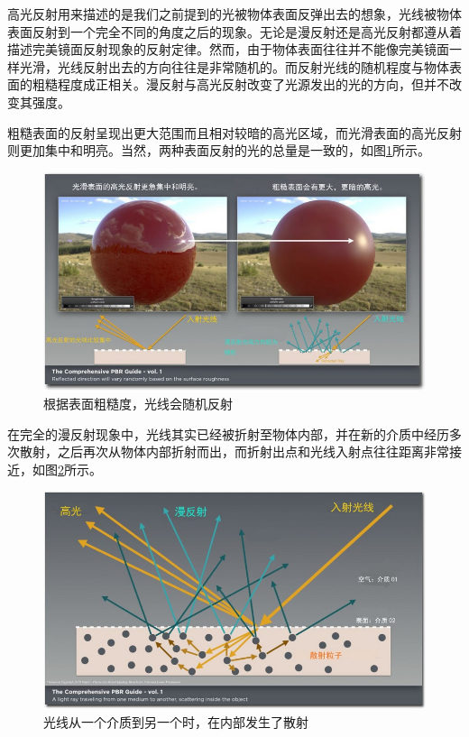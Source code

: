 高光反射用来描述的是我们之前提到的光被物体表面反弹出去的想象，光线被物体表面反射到一个完全不同的角度之后的现象。无论是漫反射还是高光反射都遵从着描述完美镜面反射现象的反射定律。然而，由于物体表面往往并不能像完美镜面一样光滑，光线反射出去的方向往往是非常随机的。而反射光线的随机程度与物体表面的粗糙程度成正相关。漫反射与高光反射改变了光源发出的光的方向，但并不改变其强度。

粗糙表面的反射呈现出更大范围而且相对较暗的高光区域，而光滑表面的高光反射则更加集中和明亮。当然，两种表面反射的光的总量是一致的，如图\ref{fig:chap1_3}所示。

\begin{figure}[ht]
    \centering
	\includegraphics[width=\textwidth]{images/chap1_3.jpg}
	\caption{根据表面粗糙度，光线会随机反射}
    \label{fig:chap1_3}
\end{figure}

在完全的漫反射现象中，光线其实已经被折射至物体内部，并在新的介质中经历多次散射，之后再次从物体内部折射而出，而折射出点和光线入射点往往距离非常接近，如图\ref{fig:chap1_4}所示。

\begin{figure}[ht]
    \centering
	\includegraphics[width=\textwidth]{images/chap1_4.jpg}
	\caption{光线从一个介质到另一个时，在内部发生了散射}
    \label{fig:chap1_4}
\end{figure}

